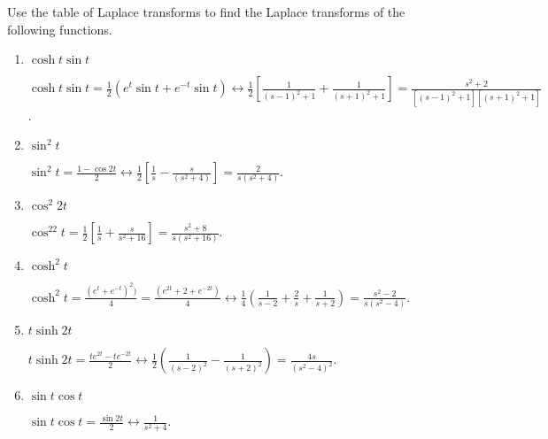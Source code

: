 \documentclass{ximera}
\begin{document}
\begin{problem}\label{exer:8.1.2}
Use  the table of Laplace transforms to
find the Laplace transforms of the following functions.

\begin{enumerate}
    \item $\cosh t\sin t$

    \begin{solution}
$\cosh t\sin t=\frac{1}{2}\left(e^t\sin t+e^{-t}\sin t\right)
\leftrightarrow\frac{1}{2}\left[\frac{1}{(s-1)^2+1}+\frac{1}{(s+1)^2+1}\right]
=\frac{s^2+2}{[(s-1)^2+1][(s+1)^2+1]}$.
    \end{solution}
    
    \item $\sin^2t$
    
    \begin{solution}
$
\sin^2t=\frac{1-\cos2t}{2}\leftrightarrow\frac{1}{2}\left[\frac{1}{s}
-\frac{s}{(s^2+4)}\right]=\frac{2}{s(s^2+4)}$.
    \end{solution}
    
    \item $\cos^2 2t$
        
    \begin{solution}
$\cos^22t=\frac{1}{2}\left[\frac{1}{s}+\frac{s}{s^2+16}\right]=
\frac{s^2+8}{s(s^2+16)}$.
    \end{solution}
    
    \item $\cosh^2 t$
        
    \begin{solution}
$\cosh^2
t=\frac{(e^t+e^{-t})^2)}{4}=\frac{(e^{2t}+2+e^{-2t})}{4}
\leftrightarrow\frac{1}{4}\left(\frac{1}{s-2}+\frac{2}{s}+\frac{1}{s+2}\right) =\frac{s^2-2}{s(s^2-4)}$.
\end{solution}
    
    \item $t\sinh 2t$
        
    \begin{solution}
$t\sinh2t=\frac{te^{2t}-te^{-2t}}{2}
\leftrightarrow\frac{1}{2}\left(\frac{1}{(s-2)^2}-\frac{1}{(s+2)^2}\right)
=\frac{4s}{(s^2-4)^2}$.
    \end{solution}
    
    \item $\sin t\cos t$
        
    \begin{solution}
$\sin t\cos t=\frac{\sin2t}{2}\leftrightarrow\frac{1}{s^2+4}$.
    \end{solution}
    

\end{enumerate}
\end{problem}
\end{document}
